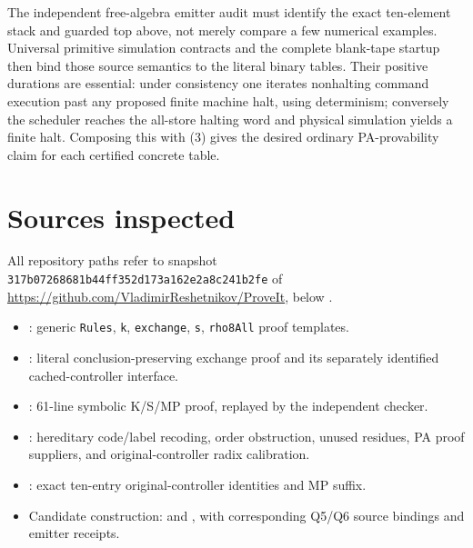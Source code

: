 \documentclass[11pt]{article}
\begin{document}
The independent free-algebra emitter audit must identify the exact
ten-element stack and guarded top above, not merely compare a few
numerical examples. Universal primitive simulation contracts and the
complete blank-tape startup then bind those source semantics to the
literal binary tables. Their positive durations are essential: under
consistency one iterates nonhalting command execution past any proposed
finite machine halt, using determinism; conversely the scheduler reaches
the all-store halting word and physical simulation yields a finite halt.
Composing this with (3) gives the desired ordinary PA-provability claim
for each certified concrete table.

\section{Sources inspected}
All repository paths refer to snapshot
\texttt{317b07268681b44ff352d173a162e2a8c241b2fe} of
\url{https://github.com/VladimirReshetnikov/ProveIt}, below
.
\begin{itemize}
\item {}:
generic \texttt{Rules}, \texttt{k}, \texttt{exchange}, \texttt{s},
\texttt{rho8All} proof templates.
\item {}:
literal conclusion-preserving exchange proof and its separately identified
cached-controller interface.
\item {}:
61-line symbolic K/S/MP proof, replayed by the independent checker.
\item {}:
hereditary code/label recoding, order obstruction, unused residues,
PA proof suppliers, and original-controller radix calibration.
\item {}:
exact ten-entry original-controller identities and MP suffix.
\item Candidate construction:  and
,
with corresponding Q5/Q6 source bindings and emitter receipts.
\end{itemize}
\end{document}

